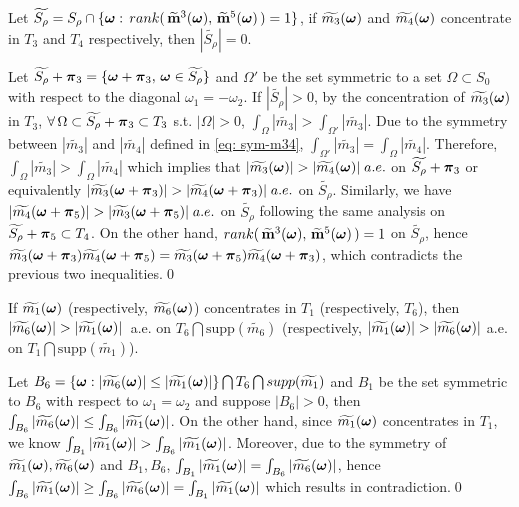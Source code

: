 \begin{lemma}\label{lem: full-rank-m35}
Let $\widetilde{S_\rho} = S_\rho\cap\{\boldsymbol{\omega}:\, rank(\,\widetilde{\mathbf{m}}^{3}(\boldsymbol{\omega}),\,\widetilde{\mathbf{m}}^{5}(\boldsymbol{\omega})\,)= 1\}$, if $\widetilde{m_{3}}(\boldsymbol{\omega})$ and $\widetilde{m_{4}}(\boldsymbol{\omega})$ concentrate in $T_3$ and $T_4$ respectively, then $|\widetilde{S_\rho}|=0$.
\end{lemma}
Let $\widetilde{S_\rho} + \boldsymbol{\pi}_3 = \{\boldsymbol{\omega} + \boldsymbol{\pi}_3,\, \boldsymbol{\omega}\in \widetilde{S_\rho}\}$ and $\Omega'$ be the set symmetric to a set $\Omega\subset S_0$ with respect to the diagonal $\omega_1 = -\omega_2$. If $|\widetilde{S_\rho}|>0$, by the concentration of $\widetilde{m_{3}}(\boldsymbol{\omega})$ in $T_3$, $\forall\, \Omega\subset \widetilde{S_\rho} + \boldsymbol{\pi}_3\subset T_3$ s.t. $|\Omega|> 0$, $\int_{\Omega}|\widetilde{m_3}| > \int_{\Omega'}|\widetilde{m_3}|$. Due to the symmetry between $|\widetilde{m_3}|$ and $|\widetilde{m_4}|$ defined in \eqref{eq: sym-m34}, $\int_{\Omega'}|\widetilde{m_3}| = \int_{\Omega}|\widetilde{m_4}|$. Therefore, $\int_{\Omega}|\widetilde{m_3}| >  \int_\Omega|\widetilde{m_4}|$ which implies that $|\widetilde{m_{3}}(\boldsymbol{\omega})| > |\widetilde{m_{4}}(\boldsymbol{\omega})|\; a.e.$ on $\widetilde{S_\rho}+\boldsymbol{\pi}_3$ or equivalently $|\widetilde{m_3}(\boldsymbol{\omega}+\boldsymbol{\pi}_3)| > |\widetilde{m_4}(\boldsymbol{\omega}+\boldsymbol{\pi}_3)|\; a.e.$ on $\widetilde{S_\rho}$. Similarly, we have $|\widetilde{m_4}(\boldsymbol{\omega}+\boldsymbol{\pi}_5)| > |\widetilde{m_3}(\boldsymbol{\omega}+\boldsymbol{\pi}_5)|\; a.e.$ on $\widetilde{S_\rho}$ following the same analysis on $\widetilde{S_\rho}+\boldsymbol{\pi}_5\subset T_4$.
On the other hand, $rank(\,\widetilde{\mathbf{m}}^{3}(\boldsymbol{\omega}),\,\widetilde{\mathbf{m}}^{5}(\boldsymbol{\omega})\,)= 1$ on $\widetilde{S_\rho}$, hence $\widetilde{m_3}(\boldsymbol{\omega}+\boldsymbol{\pi}_3)\widetilde{m_4}(\boldsymbol{\omega}+\boldsymbol{\pi}_5) = \widetilde{m_3}(\boldsymbol{\omega}+\boldsymbol{\pi}_5)\widetilde{m_4}(\boldsymbol{\omega}+\boldsymbol{\pi}_3)$, which contradicts the previous two inequalities.\qed

\begin{lemma}\label{lem: concentrate}
If $\widetilde{m_{1}}(\boldsymbol{\omega}) $ {\rm (}respectively, $\widetilde{m_{6}}(\boldsymbol{\omega})${\rm)} concentrates in $T_1$ {\rm(}respectively, $T_6${\rm)}, then $|\widetilde{m_{6}}(\boldsymbol{\omega})| > |\widetilde{m_{1}}(\boldsymbol{\omega})|\,$ a.e. on $T_6\bigcap \text{supp}(\widetilde{m_6})$ {\rm (}respectively, $|\widetilde{m_{1}}(\boldsymbol{\omega})| > |\widetilde{m_{6}}(\boldsymbol{\omega})|$ 
a.e. on $T_1\bigcap\text{supp}(\widetilde{m_1})${\rm )}.
\end{lemma}
Let $B_6=\{\boldsymbol{\omega}: |\widetilde{m_{6}}(\boldsymbol{\omega})| \leq |\widetilde{m_{1}}(\boldsymbol{\omega})|\}\bigcap T_6\bigcap supp(\widetilde{m_1})$ and $B_1$ be the set symmetric to $B_6$ with respect to $\omega_1 = \omega_2$ and suppose $|B_6|>0$, then $\int_{B_6}|\widetilde{m_{6}}(\boldsymbol{\omega})|\leq \int_{B_6}|\widetilde{m_{1}}(\boldsymbol{\omega})|$. On the other hand, since $\widetilde{m_{1}}(\boldsymbol{\omega})$ concentrates in $T_1$, we know $\int_{B_1}|\widetilde{m_{1}}(\boldsymbol{\omega})| > \int_{B_6}|\widetilde{m_{1}}(\boldsymbol{\omega})|$. Moreover, due to the symmetry of $\widetilde{m_{1}}(\boldsymbol{\omega}),\widetilde{m_{6}}(\boldsymbol{\omega})$ and $B_1,B_6$, $\int_{B_1}|\widetilde{m_{1}}(\boldsymbol{\omega})| = \int_{B_6}|\widetilde{m_{6}}(\boldsymbol{\omega})|$, hence $\int_{B_6}|\widetilde{m_{1}}(\boldsymbol{\omega})| \geq\int_{B_6}|\widetilde{m_{6}}(\boldsymbol{\omega})| = \int_{B_1}|\widetilde{m_{1}}(\boldsymbol{\omega})| $ which results in contradiction.\qed

